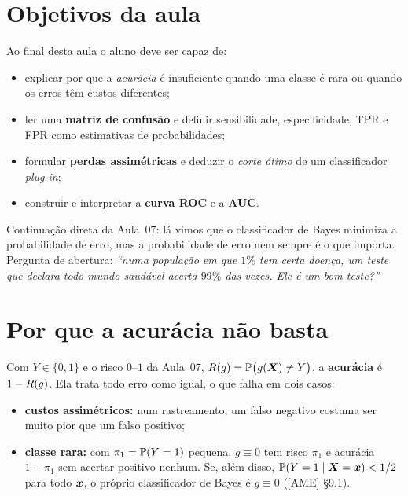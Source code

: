 \documentclass[11pt,a4paper]{article}
\begin{document}

\section*{Objetivos da aula}
Ao final desta aula o aluno deve ser capaz de:
\begin{itemize}[leftmargin=1.4cm]
  \item explicar por que a \emph{acurácia} é insuficiente quando uma classe é rara ou
        quando os erros têm custos diferentes;
  \item ler uma \textbf{matriz de confusão} e definir sensibilidade, especificidade,
        TPR e FPR como estimativas de probabilidades;
  \item formular \textbf{perdas assimétricas} e deduzir o \emph{corte ótimo} de um
        classificador \emph{plug-in};
  \item construir e interpretar a \textbf{curva ROC} e a \textbf{AUC}.
\end{itemize}

\begin{emsala}
Continuação direta da Aula~07: lá vimos que o classificador de Bayes minimiza a
probabilidade de erro, mas a probabilidade de erro nem sempre é o que importa.
Pergunta de abertura: \emph{``numa população em que $1\%$ tem certa doença, um teste
que declara todo mundo saudável acerta $99\%$ das vezes. Ele é um bom teste?''}
\end{emsala}

\section{Por que a acurácia não basta}
Com $Y\in\{0,1\}$ e o risco $0$--$1$ da Aula~07, $R(g)=\mathbb{P}\big(g(\bm{X})\neq Y\big)$,
a \textbf{acurácia} é $1-R(g)$. Ela trata todo erro como igual, o que falha em
dois casos:
\begin{itemize}[leftmargin=1.4cm,nosep]
  \item \textbf{custos assimétricos:} num rastreamento, um falso negativo costuma ser
        muito pior que um falso positivo;
  \item \textbf{classe rara:} com $\pi_1=\mathbb{P}(Y=1)$ pequena, $g\equiv0$ tem risco
        $\pi_1$ e acurácia $1-\pi_1$ sem acertar positivo nenhum. Se, além disso,
        $\mathbb{P}(Y=1\mid\bm{X}=\bm{x})<1/2$ para todo $\bm{x}$, o próprio classificador de Bayes é
        $g\equiv0$ ([AME] §9.1).
\end{itemize}
\end{document}
